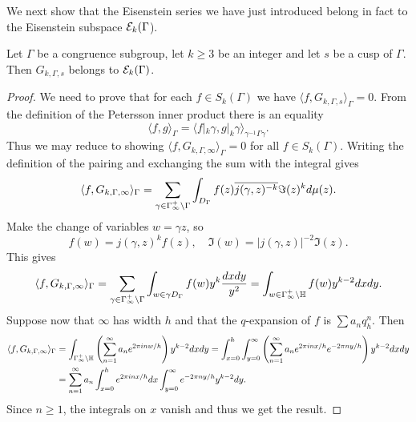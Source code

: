 We next show that the Eisenstein series we have just introduced belong in fact to the Eisenstein subspace $\mathcal{E}_k(\Gamma$).
\begin{proposition}
 Let $\Gamma$ be a congruence subgroup, let $k\geq 3$ be an integer and let $s$ be a cusp of $\Gamma$. Then $G_{k,\Gamma,s}$ belongs to $\mathcal{E}_k(\Gamma)$.
\end{proposition}
\begin{proof}
  We need to prove that for each $f\in S_k(\Gamma)$ we have $\langle f,G_{k,\Gamma,s}\rangle_\Gamma = 0$. From the definition of the Petersson inner product there is an equality
\[
\langle f,g\rangle_\Gamma = \langle f|_k\gamma,g|_k\gamma\rangle_{\gamma^{-1}\Gamma\gamma}.
\]
Thus we may reduce to showing $\langle f,G_{k,\Gamma,\infty}\rangle_\Gamma=0$ for all $f\in S_k(\Gamma)$. Writing the definition of the pairing and exchanging the sum with the integral gives
\[
\langle f,G_{k,\Gamma,\infty}\rangle_\Gamma = \sum_{\gamma\in \Gamma_\infty^+\backslash \Gamma} \int_{D_\Gamma} f(z)\overline{j(\gamma,z)^{-k}} \Im(z)^kd\mu(z).
\]
Make the change of variables $w=\gamma z$, so
\[
f(w)=j(\gamma,z)^kf(z),\quad \Im(w)=|j(\gamma,z)|^{-2}\Im(z).
\]
This gives
\[
\langle f,G_{k,\Gamma,\infty}\rangle_\Gamma = \sum_{\gamma\in\Gamma_\infty^+\backslash \Gamma}\int_{w\in \gamma D_\Gamma} f(w) y^k\frac{dxdy}{y^2} = \int_{w\in\Gamma_\infty^+\backslash\mathbb{H}} f(w)y^{k-2}dxdy.
\]
Suppose now that $\infty$ has width $h$ and that the $q$-expansion of $f$ is $\sum a_n q_h^n$. Then
\begin{align*}
\langle f,G_{k,\Gamma,\infty}\rangle_\Gamma &= \int_{\Gamma_\infty^+\backslash \mathbb{H}}\left(\sum_{n=1}^\infty a_n e^{2\pi i nw/h}\right)y^{k-2}dxdy= \int_{x=0}^h\int_{y=0}^\infty\left(\sum_{n=1}^\infty a_n e^{2\pi i nx/h}e^{-2\pi ny/h}\right)y^{k-2}dxdy\\
&=\sum_{n=1}^\infty a_n \int_{x=0}^h e^{2\pi i nx/h} dx\int_{y=0}^\infty e^{-2\pi ny/h} y^{k-2}dy.
\end{align*}
Since $n\geq 1$, the integrals on $x$ vanish and thus we get the result.
\end{proof}



